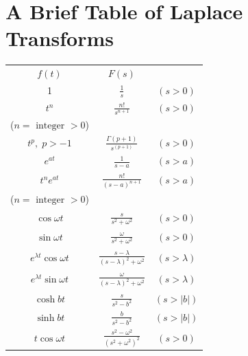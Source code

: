 \section{A Brief Table of Laplace Transforms}

\begin{center}
  \begin{tabular}{ccc}
    {$f(t)$}                    & {$F(s)$}                                                         & {}             \\[15pt]
    1                           & $\displaystyle{\frac{1}{s}}$                                     & $(s>0)$        \\[15pt]
    $t^{n}$                     & $\displaystyle{\frac{n!}{s^{n+1}}}$                              & $(s>0)$        \\
    ($n=\mbox{ integer }>0$)    & {}                                                               & {}             \\[15pt]
    $t^{p},\;p>-1$              & $\displaystyle{\frac{\Gamma(p+1)}{s^{(p+1)}}}$                   & $(s>0)$        \\[15pt]
    $e^{at}$                    & $\displaystyle{\frac{1}{s-a}}$                                   & $(s>a)$        \\[15pt]
    $t^{n}e^{at}$               & $\displaystyle{\frac{n!}{(s-a)^{n+1}}}$                          & $(s> a)$        \\[15pt]
    ($n=\mbox{ integer }>0$)    & {}                                                               & {}             \\
    $\cos\omega t$              & $\displaystyle{\frac{s}{s^{2}+\omega^{2}}}$                      & $(s>0)$        \\[15pt]
    $\sin\omega t$              & $\displaystyle{\frac{\omega}{s^{2}+\omega^{2}}}$                 & $(s>0)$        \\[15pt]
    $e^{\lambda t}\cos\omega t$ & $\displaystyle{\frac{s-\lambda}{(s-\lambda)^{2}+\omega^{2}}}$    & $(s> \lambda)$ \\[15pt]
    $e^{\lambda t}\sin\omega t$ & $\displaystyle{\frac{\omega}{(s-\lambda)^{2}+\omega^{2}}}$       & $(s> \lambda)$ \\[15pt]
    $\cosh bt$                  & $\displaystyle{\frac{s}{s^{2}-b^{2}}}$                           & $(s>|b|)$      \\[15pt]
    $\sinh bt$                  & $\displaystyle{\frac{b}{s^{2}-b^{2}}}$                           & $(s>|b|)$      \\[15pt]
    $t\cos\omega t$             & $\displaystyle{\frac{s^{2}-\omega^{2}}{(s^{2}+\omega^{2})^{2}}}$ & $(s>0)$
  \end{tabular}
\end{center}

